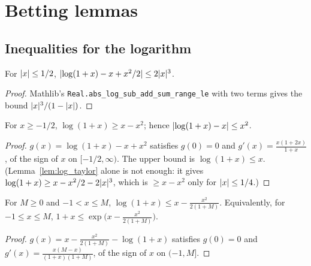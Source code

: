 \chapter{Betting lemmas}
\label{chap:pre_betting}

\section{Inequalities for the logarithm}

\begin{lemma}
  \label{lem:log_taylor}
  \leanok
  For $\lvert x \rvert \le 1/2$, $\lvert \log(1+x) - x + x^2/2 \rvert \le 2\lvert x \rvert^3$.
\end{lemma}

\begin{proof}
  \leanok
  Mathlib's \texttt{Real.abs\_log\_sub\_add\_sum\_range\_le} with two terms gives the bound
  $\lvert x \rvert^3/(1 - \lvert x \rvert)$.
\end{proof}

\begin{lemma}
  \label{lem:log_ge_sub_sq}
  \leanok
  For $x \ge -1/2$, $\log(1 + x) \ge x - x^2$; hence $\lvert \log(1 + x) - x \rvert \le x^2$.
\end{lemma}

\begin{proof}
  \leanok
  $g(x) = \log(1+x) - x + x^2$ satisfies $g(0) = 0$ and $g'(x) = \frac{x(1 + 2x)}{1 + x}$, of the
  sign of $x$ on $[-1/2, \infty)$. The upper bound is $\log(1+x) \le x$. (Lemma~\ref{lem:log_taylor} alone is not enough: it gives
  $\log(1+x) \ge x - x^2/2 - 2\lvert x \rvert^3$, which is $\ge x - x^2$ only for $\lvert x \rvert \le 1/4$.)
\end{proof}

\begin{lemma}
  \label{lem:log_le_sub_mul_sq}
  \leanok
  For $M \ge 0$ and $-1 < x \le M$, $\log(1+x) \le x - \frac{x^2}{2(1+M)}$. Equivalently, for
  $-1 \le x \le M$, $1 + x \le \exp\big(x - \frac{x^2}{2(1+M)}\big)$.
\end{lemma}

\begin{proof}
  \leanok
  $g(x) = x - \frac{x^2}{2(1+M)} - \log(1+x)$ satisfies $g(0) = 0$ and
  $g'(x) = \frac{x(M - x)}{(1+x)(1+M)}$, of the sign of $x$ on $(-1, M]$.
\end{proof}

